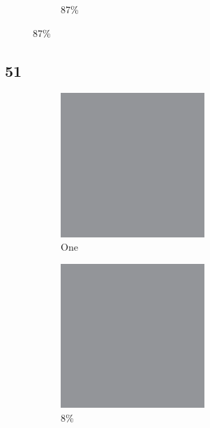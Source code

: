 \documentclass[12pt, fleqn]{report}                             %
\theoremstyle{break}                                            %
\begin{document}
\begin{figure}[ht!]
\begin{subfigure}[b]{0.4\linewidth}
          \caption{87\%}
        \end{subfigure}
      \end{figure}


      \clearpage
      \subsection{51}
      \begin{figure}[ht!]
        \centering
        \begin{subfigure}[b]{0.4\linewidth}
          \includegraphics[width=0.6\textwidth]{Images/51/a.png}
          \caption{One}
        \end{subfigure}
        \begin{subfigure}[b]{0.4\linewidth}
          \includegraphics[width=0.6\textwidth]{Images/51/b.png}
          \caption{8\%}
        \end{subfigure}
        \begin{subfigure}[b]{0.4\linewidth}

\end{subfigure}
\end{figure}
\end{document}
